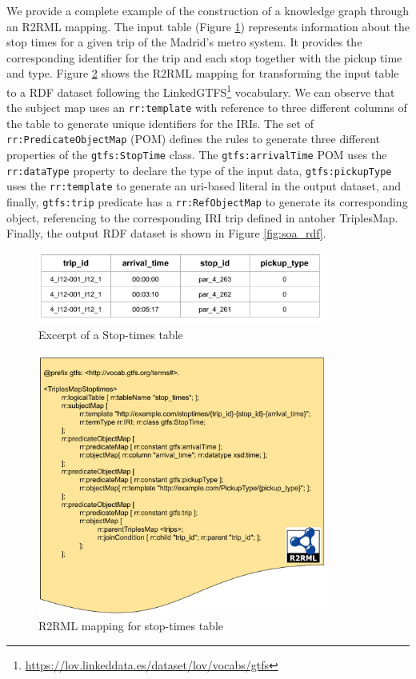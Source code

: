 We provide a complete example of the construction of a knowledge graph through an R2RML mapping. The input table (Figure \ref{fig:soa_csv}) represents information about the stop times for a given trip of the Madrid's metro system. It provides the corresponding identifier for the trip and each stop together with the pickup time and type. Figure \ref{fig:soa_r2rml} shows the R2RML mapping for transforming the input table to a RDF dataset following the LinkedGTFS\footnote{\url{https://lov.linkeddata.es/dataset/lov/vocabs/gtfs}} vocabulary. We can observe that the subject map uses an \texttt{rr:template} with reference to three different columns of the table to generate unique identifiers for the IRIs. The set of \texttt{rr:PredicateObjectMap} (POM) defines the rules to generate three different properties of the \texttt{gtfs:StopTime} class. The \texttt{gtfs:arrivalTime} POM uses the \texttt{rr:dataType} property to declare the type of the input data, \texttt{gtfs:pickupType} uses the \texttt{rr:template} to generate an uri-based literal in the output dataset, and finally, \texttt{gtfs:trip} predicate has a \texttt{rr:RefObjectMap} to generate its corresponding object, referencing to the corresponding IRI trip defined in antoher TriplesMap. Finally, the output RDF dataset is shown in Figure \ref{fig:soa_rdf}.

\begin{figure}[!t]
\centering
\includegraphics[width=0.85\textwidth]{figures/state-of-the-art/Stop_times CSV.pdf}
\caption{Excerpt of a Stop-times table}
\label{fig:soa_csv}
\end{figure}

\begin{figure}[!ht]
\centering
\includegraphics[width=0.85\textwidth]{figures/state-of-the-art/R2RML-example.pdf}
\caption{R2RML mapping for stop-times table}
\label{fig:soa_r2rml}
\end{figure}


